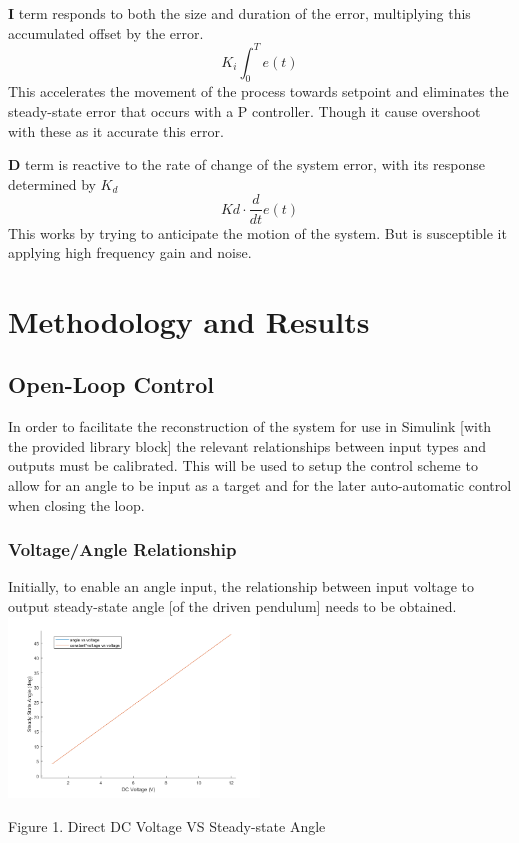 \documentclass[a4paper,11pt]{article}
\begin{document}
\textbf{I} term responds to both the size and duration of the error, multiplying this accumulated offset by the error.
$$K_i \int_{0}^{T} e(t) $$
This accelerates the movement of the process towards setpoint and eliminates the steady-state error that occurs with a P controller. Though it cause overshoot with these as it accurate this error.

\textbf{D} term is reactive to the rate of change of the system error, with its response determined by $K_d$
$$Kd\cdot \frac{d}{dt}e(t)$$
This works by trying to anticipate the motion of the system. But is susceptible it applying high frequency gain and noise.


\newpage
\section{Methodology and Results}
\subsection{Open-Loop Control}
In order to facilitate the reconstruction of the system for use in Simulink [with the provided library block] the relevant relationships between input types and outputs must be calibrated. This will be used to setup the control scheme to allow for an angle to be input as a target and for the later auto-automatic control when closing the loop.
\subsubsection{Voltage/Angle Relationship}
Initially, to enable an angle input, the relationship between input voltage to output steady-state angle [of the driven pendulum] needs to be obtained. \\

{\centering\includegraphics[width=0.5\textwidth]{inc/angle_v_volt.png} \\}
\begin{center}
        Figure 1. Direct DC Voltage VS Steady-state Angle
\end{center}
\end{document}
